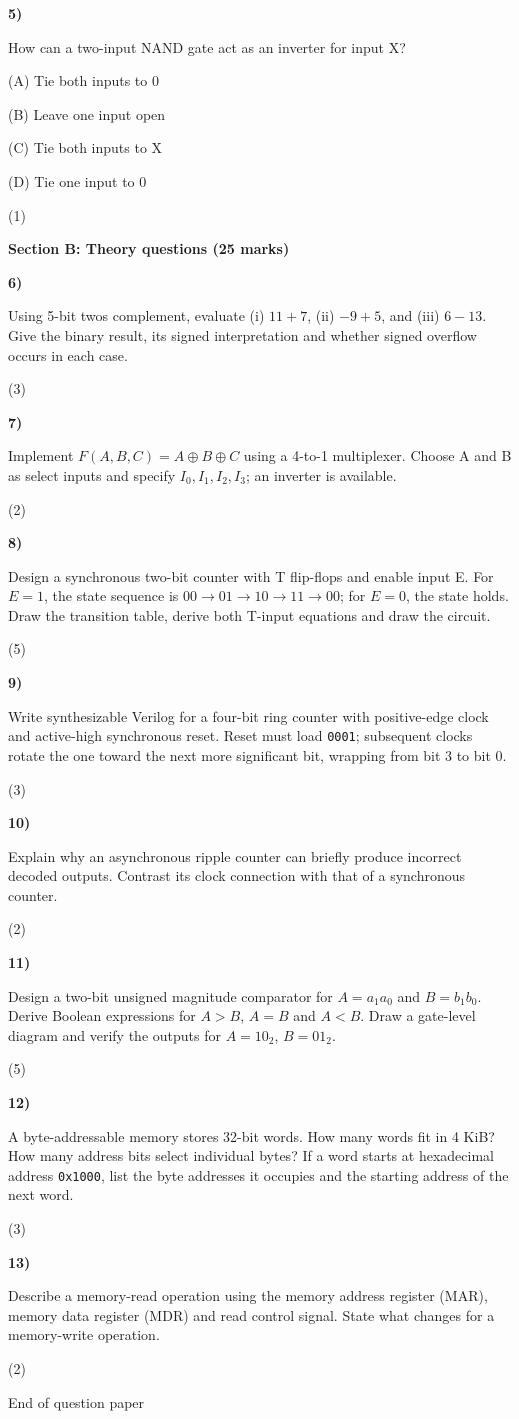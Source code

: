 \documentclass[11pt,a4paper]{article}
\newcommand{\question}[3]{\par\vspace{8pt}\noindent\begin{minipage}[t]{0.075\linewidth}\textbf{#1)}\end{minipage}\begin{minipage}[t]{0.855\linewidth}#3\end{minipage}\hfill\begin{minipage}[t]{0.055\linewidth}\raggedleft(#2)\end{minipage}\par}
\begin{document}
\question{5}{1}{How can a two-input NAND gate act as an inverter for input X?\par (A) Tie both inputs to 0\par (B) Leave one input open\par (C) Tie both inputs to X\par (D) Tie one input to 0}
\newpage\textbf{Section B: Theory questions (25 marks)}\par
\question{6}{3}{Using 5-bit two\textquotesingle s complement, evaluate (i) $11+7$, (ii) $-9+5$, and (iii) $6-13$. Give the binary result, its signed interpretation and whether signed overflow occurs in each case.}
\question{7}{2}{Implement $F(A,B,C)=A\oplus B\oplus C$ using a 4-to-1 multiplexer. Choose A and B as select inputs and specify $I_0,I_1,I_2,I_3$; an inverter is available.}
\question{8}{5}{Design a synchronous two-bit counter with T flip-flops and enable input E. For $E=1$, the state sequence is $00\to01\to10\to11\to00$; for $E=0$, the state holds. Draw the transition table, derive both T-input equations and draw the circuit.}
\question{9}{3}{Write synthesizable Verilog for a four-bit ring counter with positive-edge clock and active-high synchronous reset. Reset must load \texttt{0001}; subsequent clocks rotate the one toward the next more significant bit, wrapping from bit 3 to bit 0.}
\question{10}{2}{Explain why an asynchronous ripple counter can briefly produce incorrect decoded outputs. Contrast its clock connection with that of a synchronous counter.}
\question{11}{5}{Design a two-bit unsigned magnitude comparator for $A=a_1a_0$ and $B=b_1b_0$. Derive Boolean expressions for $A>B$, $A=B$ and $A<B$. Draw a gate-level diagram and verify the outputs for $A=10_2$, $B=01_2$.}
\question{12}{3}{A byte-addressable memory stores 32-bit words. How many words fit in 4 KiB? How many address bits select individual bytes? If a word starts at hexadecimal address \texttt{0x1000}, list the byte addresses it occupies and the starting address of the next word.}
\question{13}{2}{Describe a memory-read operation using the memory address register (MAR), memory data register (MDR) and read control signal. State what changes for a memory-write operation.}
\vfill\begin{center}\small End of question paper\end{center}
\end{document}
